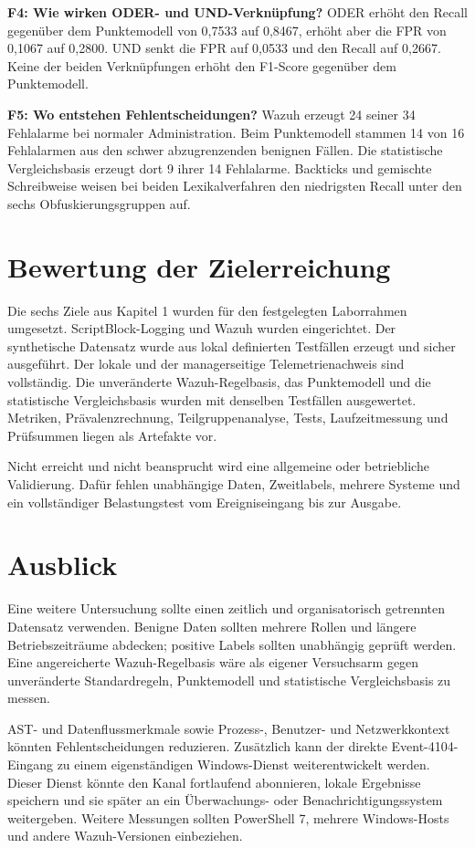 \documentclass[12pt,a4paper,oneside,parskip=half]{scrreprt}
\begin{document}
\textbf{F4: Wie wirken ODER- und UND-Verknüpfung?} ODER erhöht den Recall gegenüber dem Punktemodell von 0{,}7533 auf 0{,}8467, erhöht aber die FPR von 0{,}1067 auf 0{,}2800. UND senkt die FPR auf 0{,}0533 und den Recall auf 0{,}2667. Keine der beiden Verknüpfungen erhöht den F1-Score gegenüber dem Punktemodell.

\textbf{F5: Wo entstehen Fehlentscheidungen?} Wazuh erzeugt 24 seiner 34 Fehlalarme bei normaler Administration. Beim Punktemodell stammen 14 von 16 Fehlalarmen aus den schwer abzugrenzenden benignen Fällen. Die statistische Vergleichsbasis erzeugt dort 9 ihrer 14 Fehlalarme. Backticks und gemischte Schreibweise weisen bei beiden Lexikalverfahren den niedrigsten Recall unter den sechs Obfuskierungsgruppen auf.
\section{Bewertung der Zielerreichung}
Die sechs Ziele aus Kapitel 1 wurden für den festgelegten Laborrahmen umgesetzt. ScriptBlock-Logging und Wazuh wurden eingerichtet. Der synthetische Datensatz wurde aus lokal definierten Testfällen erzeugt und sicher ausgeführt. Der lokale und der managerseitige Telemetrienachweis sind vollständig. Die unveränderte Wazuh-Regelbasis, das Punktemodell und die statistische Vergleichsbasis wurden mit denselben Testfällen ausgewertet. Metriken, Prävalenzrechnung, Teilgruppenanalyse, Tests, Laufzeitmessung und Prüfsummen liegen als Artefakte vor.

Nicht erreicht und nicht beansprucht wird eine allgemeine oder betriebliche Validierung. Dafür fehlen unabhängige Daten, Zweitlabels, mehrere Systeme und ein vollständiger Belastungstest vom Ereigniseingang bis zur Ausgabe.

\section{Ausblick}
Eine weitere Untersuchung sollte einen zeitlich und organisatorisch getrennten Datensatz verwenden. Benigne Daten sollten mehrere Rollen und längere Betriebszeiträume abdecken; positive Labels sollten unabhängig geprüft werden. Eine angereicherte Wazuh-Regelbasis wäre als eigener Versuchsarm gegen unveränderte Standardregeln, Punktemodell und statistische Vergleichsbasis zu messen.

AST- und Datenflussmerkmale sowie Prozess-, Benutzer- und Netzwerkkontext könnten Fehlentscheidungen reduzieren. Zusätzlich kann der direkte Event-4104-Eingang zu einem eigenständigen Windows-Dienst weiterentwickelt werden. Dieser Dienst könnte den Kanal fortlaufend abonnieren, lokale Ergebnisse speichern und sie später an ein Überwachungs- oder Benachrichtigungssystem weitergeben. Weitere Messungen sollten PowerShell 7, mehrere Windows-Hosts und andere Wazuh-Versionen einbeziehen.
\end{document}
